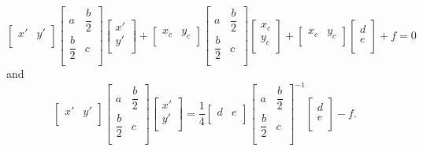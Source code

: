 \documentclass[aps]{revtex4}
\begin{document}
\begin{equation}
	\begin{bmatrix}
x' & y'\\
\end{bmatrix}
\begin{bmatrix}
 a & \dfrac{b}{2} \\
 \dfrac{b}{2} & c\\
\end{bmatrix}
	\begin{bmatrix}
	x'\\
	y'\\
	\end{bmatrix} 
	+
		\begin{bmatrix}
x_c & y_c\\
\end{bmatrix}
\begin{bmatrix}
 a & \dfrac{b}{2} \\
 \dfrac{b}{2} & c\\
\end{bmatrix}
	\begin{bmatrix}
	x_c\\
	y_c\\
	\end{bmatrix} 
+
	\begin{bmatrix}
x_c & y_c\\
\end{bmatrix}	
\begin{bmatrix}
	d\\
	e\\
	\end{bmatrix}
+
	 f = 0
\end{equation}
and
\begin{equation}
\begin{bmatrix}
x' & y'\\
\end{bmatrix}
\begin{bmatrix}
 a & \dfrac{b}{2} \\
 \dfrac{b}{2} & c\\
\end{bmatrix}
	\begin{bmatrix}
	x'\\
	y'\\
	\end{bmatrix} = \dfrac{1}{4} 
	\begin{bmatrix}
	d & e\\
	\end{bmatrix}
	\begin{bmatrix}
		a & \dfrac{b}{2} \\
 		\dfrac{b}{2} & c\\	\end{bmatrix}^{-1}
	 \begin{bmatrix}
	d\\
	e\\
	\end{bmatrix}- f.
\end{equation}
\end{document}
